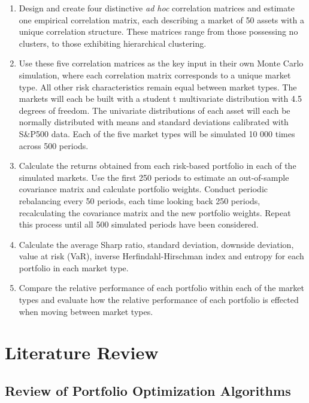 \documentclass[11pt,preprint, authoryear]{elsarticle}
\numberwithin{equation}{section}
\numberwithin{figure}{section}
\numberwithin{table}{section}
\begin{document}
\begin{enumerate}
\def\labelenumi{\arabic{enumi}.}
\item
  Design and create four distinctive \emph{ad hoc} correlation matrices
  and estimate one empirical correlation matrix, each describing a
  market of 50 assets with a unique correlation structure. These
  matrices range from those possessing no clusters, to those exhibiting
  hierarchical clustering.
\item
  Use these five correlation matrices as the key input in their own
  Monte Carlo simulation, where each correlation matrix corresponds to a
  unique market type. All other risk characteristics remain equal
  between market types. The markets will each be built with a student t
  multivariate distribution with 4.5 degrees of freedom. The univariate
  distributions of each asset will each be normally distributed with
  means and standard deviations calibrated with S\&P500 data. Each of
  the five market types will be simulated 10 000 times across 500
  periods.
\item
  Calculate the returns obtained from each risk-based portfolio in each
  of the simulated markets. Use the first 250 periods to estimate an
  out-of-sample covariance matrix and calculate portfolio weights.
  Conduct periodic rebalancing every 50 periods, each time looking back
  250 periods, recalculating the covariance matrix and the new portfolio
  weights. Repeat this process until all 500 simulated periods have been
  considered.
\item
  Calculate the average Sharp ratio, standard deviation, downside
  deviation, value at risk (VaR), inverse Herfindahl-Hirschman index and
  entropy for each portfolio in each market type.
\item
  Compare the relative performance of each portfolio within each of the
  market types and evaluate how the relative performance of each
  portfolio is effected when moving between market types.
\end{enumerate}

\newpage

\hypertarget{literature-review}{%
\section{\texorpdfstring{Literature Review
\label{lit}}{Literature Review }}\label{literature-review}}

\hypertarget{review-of-portfolio-optimization-algorithms}{%
\subsection{Review of Portfolio Optimization
Algorithms}\label{review-of-portfolio-optimization-algorithms}}
\end{document}
